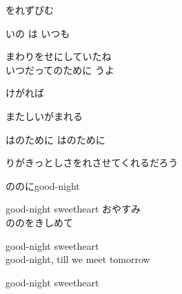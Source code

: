 {をれずびむ 

いの は いつも

まわりをせにしていたね
\\

いつだってのために うよ

けがれば

またしいがまれる

はのために はのために

りがきっとしさをれさせてくれるだろう

ののにgood-night

good-night sweetheart おやすみ
\\

ののをきしめて

good-night sweetheart
\\

good-night, till we meet tomorrow

good-night sweetheart

}
